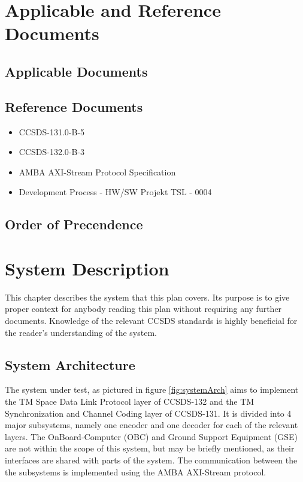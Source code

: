 \chapter{Applicable and Reference Documents}

\section{Applicable Documents}
\section{Reference Documents}
\begin{itemize}
	\item CCSDS-131.0-B-5
	\item CCSDS-132.0-B-3
	\item AMBA AXI-Stream Protocol Specification
	\item Development Process - HW/SW Projekt TSL - 0004
\end{itemize}
\section{Order of Precendence}

\chapter{System Description}

This chapter describes the system that this plan covers. Its purpose is to give proper context for anybody reading this plan without requiring any further documents. Knowledge of the relevant CCSDS standards is highly beneficial for the reader's understanding of the system.

\section{System Architecture}

The system under test, as pictured in figure \ref{fig:systemArch} aims to implement the TM Space Data Link Protocol layer of CCSDS-132 and the TM Synchronization and Channel Coding layer of CCSDS-131. It is divided into 4 major subsystems, namely one encoder and one decoder for each of the relevant layers. The OnBoard-Computer (OBC) and Ground Support Equipment (GSE) are not within the scope of this system, but may be briefly mentioned, as their interfaces are shared with parts of the system. The communication between the the subsystems is implemented using the AMBA AXI-Stream protocol.

